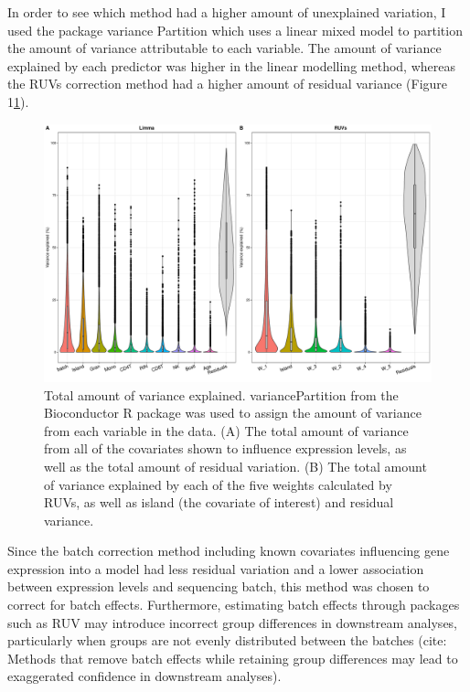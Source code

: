 \documentclass[12pt,a4paper,titlepage,twoside,openright]{book}
\begin{document}
\begin{mainmatter}
In order to see which method had a higher amount of unexplained variation, I used the package variance Partition which uses a linear mixed model to partition the amount of variance attributable to each variable. The amount of variance explained by each predictor was higher in the linear modelling method, whereas the RUVs correction method had a higher amount of residual variance (﻿Figure 1\ref{fig:Variance Explained}).

\begin{figure}[htb!]
\centering
\includegraphics[width=\textwidth,height=\textheight,keepaspectratio]{VarianceExplained_LMvsRUVs.pdf}
\caption{Total amount of variance explained. variancePartition from the Bioconductor R package was used to assign the amount of variance from each variable in the data. (A) The total amount of variance from all of the covariates shown to influence expression levels, as well as the total amount of residual variation. (B) The total amount of variance explained by each of the five weights calculated by RUVs, as well as island (the covariate of interest) and residual variance.}
\label{fig:Variance Explained}
\end{figure}

Since the batch correction method including known covariates influencing gene expression into a model had less residual variation and a lower association between expression levels and sequencing batch, this method was chosen to correct for batch effects. Furthermore, estimating batch effects through packages such as RUV may introduce incorrect group differences in downstream analyses, particularly when groups are not evenly distributed between the batches (cite: Methods that remove batch effects while retaining group differences may lead to exaggerated confidence in downstream analyses).


\end{mainmatter}
\end{document}
